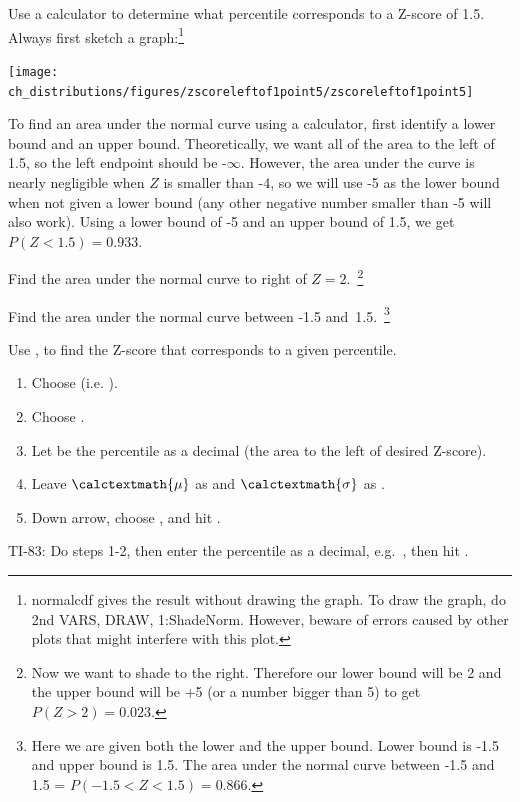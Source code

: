 \begin{example}{Use a calculator to determine what percentile corresponds to a Z-score of 1.5.}
Always first sketch a graph:\footnote{normalcdf gives the result without drawing the graph. To draw the graph, do 2nd VARS, DRAW, 1:ShadeNorm. However, beware of errors caused by other plots that might interfere with this plot.}
\begin{center}
\texttt{[image: ch\_distributions/figures/zscoreleftof1point5/zscoreleftof1point5]}\vspace{-2mm}
\end{center}
To find an area under the normal curve using a calculator, first identify a lower bound and an upper bound. Theoretically, we want all of the area to the left of 1.5, so the left endpoint should be -$\infty$. However, the area under the curve is nearly negligible when $Z$ is smaller than -4, so we will use -5 as the lower bound when not given a lower bound (any other negative number smaller than -5 will also work). Using a lower bound of -5 and an upper bound of 1.5, we get $P(Z < 1.5) = 0.933$.
\end{example}

\begin{exercise}
Find the area under the normal curve to right of $Z=2$.~\footnote{Now we want to shade to the right. Therefore our lower bound will be 2 and the upper bound will be +5 (or a number bigger than 5) to get $P(Z > 2) = 0.023$.}
\end{exercise}

\begin{exercise}Find the area under the normal curve between -1.5 and~1.5.~\footnote{Here we are given both the lower and the upper bound. Lower bound is -1.5 and upper bound is 1.5. The area under the normal curve between -1.5 and 1.5 = $P(-1.5 < Z < 1.5) = 0.866$.}
\end{exercise}

\begin{termBox}{
Use  ,  to find the Z-score that corresponds to a given percentile.
\begin{enumerate}
\setlength{\itemsep}{0mm}
\item Choose   (i.e. ).
\item Choose .
\item Let  be the percentile as a decimal (the area to the left of desired Z-score).
\item Leave $\calctextmath{\mu}$ as  and $\calctextmath{\sigma}$ as .
\item Down arrow, choose , and hit .\vspace{-1.5mm}
\end{enumerate}
TI-83: Do steps 1-2, then enter the percentile as a decimal, e.g.~\mbox{,} then hit .}
\end{termBox}

